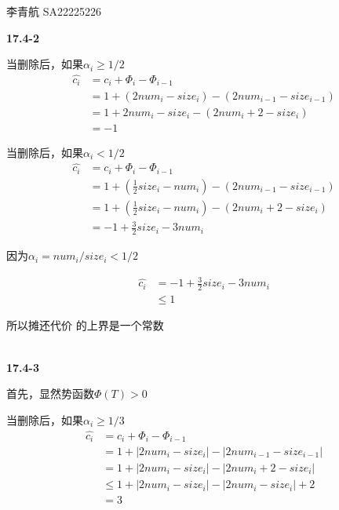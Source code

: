 \documentclass[UTF8]{ctexart}
\begin{document}
    李青航 SA22225226

    \noindent\textbf{17.4-2}

    当删除后，如果$\alpha _i\ge 1/2$
    \begin{equation*}
        \begin{aligned}
            \hat{c_i}&=c_i+\Phi _i -\Phi _{i-1}\\
            &=1+(2num_i-size_i)-(2num_{i-1}-size_{i-1})\\
            &=1+2num_i-size_i-(2num_i+2-size_i)\\
            &=-1
        \end{aligned}
    \end{equation*}

    当删除后，如果$\alpha _i <1/2$ 
    \begin{equation*}
        \begin{aligned}
            \hat{c_i}&=c_i+\Phi _i -\Phi _{i-1}\\
            &=1+(\frac{1}{2}size_i-num_i)-(2num_{i-1}-size_{i-1})\\
            &=1+(\frac{1}{2}size_i-num_i)-(2num_i+2-size_i)\\
            &=-1+\frac{3}{2}size_i-3num_i
        \end{aligned}
    \end{equation*}

    因为$\alpha _i=num_i/size_i<1/2$

    \begin{equation*}
        \begin{aligned}
            \hat{c_i}&=-1+\frac{3}{2}size_i-3num_i\\
            &\le 1
        \end{aligned}
    \end{equation*}

    所以摊还代价 的上界是一个常数


    ~\\
    \noindent\textbf{17.4-3}

    首先，显然势函数$\Phi(T)>0$

    当删除后，如果$\alpha _i \ge 1/3$
    \begin{equation*}
        \begin{aligned}
            \hat{c_i}&=c_i+\Phi _i -\Phi _{i-1}\\
            &=1+|2num_i-size_i|-|2num_{i-1}-size_{i-1}|\\
            &=1+|2num_i-size_i|-|2num_i+2-size_i|\\
            &\le 1+|2num_i-size_i|-|2num_i-size_i|+2\\
            &=3
        \end{aligned}
    \end{equation*}
\end{document}
